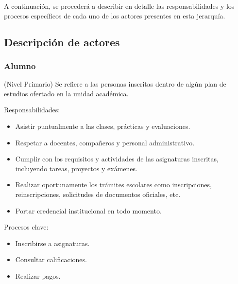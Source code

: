 A continuación, se procederá a describir en detalle las responsabilidades y los procesos específicos de cada uno de los actores presentes en esta jerarquía.






\newpage

\subsection{Descripción de actores}

\begin{Usuario}{\hypertarget{tAlumno}{\subsubsection{Alumno}}}{(Nivel Primario)}{
        Se refiere a las personas inscritas dentro de algún plan de estudios ofertado en la unidad académica.
    }
    \item[Responsabilidades:] \cdtEmpty
    \begin{itemize}
        \item Asistir puntualmente a las clases, prácticas y evaluaciones.
        \item Respetar a docentes, compañeros y personal administrativo.
        \item Cumplir con los requisitos y actividades de las asignaturas inscritas, incluyendo tareas, proyectos y exámenes.
        \item Realizar oportunamente los trámites escolares como inscripciones, reinscripciones, solicitudes de documentos oficiales, etc.
        \item Portar credencial institucional en todo momento.
    \end{itemize}
    \item[Procesos clave:] \cdtEmpty
    \begin{itemize}
         \item Inscribirse a asignaturas.
         \item Consultar calificaciones.
         \item Realizar pagos.
    \end{itemize}
\end{Usuario}

